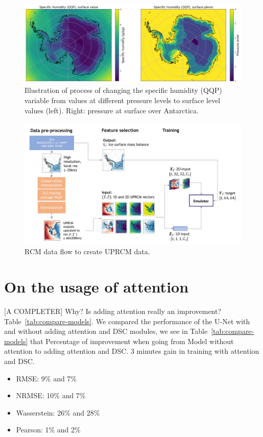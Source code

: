 \documentclass[a4paper,11pt,oneside]{report}
\begin{document}
\begin{figure}[!htb]
  \centering
  \includegraphics[width=\columnwidth]{doc/Thesis-latex/images/example-plevels.pdf}
  \caption []{\small Illustration of process of changing the specific humidity (QQP) variable from values at different pressure levels to surface level values (left). Right: pressure at surface over Antarctica. }
  \vspace{-3mm}
  \label{fig:example-plevels}
\end{figure}



\begin{figure}[!htb]
  \centering
  \includegraphics[width=\columnwidth]{images/data-flow.pdf}
  \caption []{\small RCM data flow to create UPRCM data.}
  \vspace{-3mm}
  \label{fig:training-data-flow}
\end{figure}

\section{On the usage of attention}
[A COMPLETER] Why? Is adding attention really an improvement? Table~\ref{tab:compare-models}. We compared the performance of the U-Net with and without adding attention and DSC modules, we see in Table~\ref{tab:compare-models} that 
Percentage of improvement when going from Model without attention to adding attention and DSC. 3 minutes gain in training with attention and DSC.
\begin{itemize}
    \item RMSE: 9\% and 7\%
    \item NRMSE: 10\% and 7\%
    \item Wasserstein: 26\% and 28\%
    \item Pearson: 1\% and 2\% 
\end{itemize}

\newpage
\begin{landscape}

\end{landscape}
\end{document}
